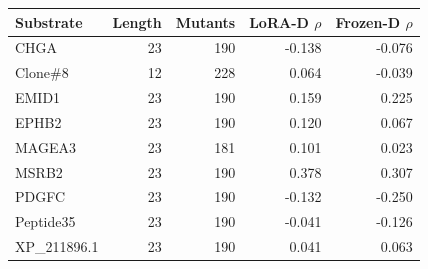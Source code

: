 
{\small\setlength{\tabcolsep}{4pt}
\begin{tabularx}{\textwidth}{Xrrrr}
\toprule
Substrate & Length & Mutants & LoRA-D $\rho$ & Frozen-D $\rho$ \\
\midrule
CHGA & 23 & 190 & -0.138 & -0.076 \\
Clone\#8 & 12 & 228 & 0.064 & -0.039 \\
EMID1 & 23 & 190 & 0.159 & 0.225 \\
EPHB2 & 23 & 190 & 0.120 & 0.067 \\
MAGEA3 & 23 & 181 & 0.101 & 0.023 \\
MSRB2 & 23 & 190 & 0.378 & 0.307 \\
PDGFC & 23 & 190 & -0.132 & -0.250 \\
Peptide35 & 23 & 190 & -0.041 & -0.126 \\
XP_211896.1 & 23 & 190 & 0.041 & 0.063 \\
\bottomrule
\end{tabularx}}
